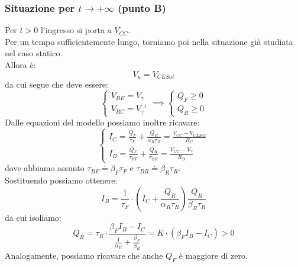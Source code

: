 \documentclass[../main.tex]{subfiles}
\begin{document}
	\subsubsection{Situazione per $t \rightarrow +\infty$ (punto B)}
	Per $t > 0$ l'ingresso si porta a $V_{CC}$.\\
	Per un tempo sufficientemente lungo, torniamo poi nella situazione già studiata nel caso statico.\\
	Allora è:
	\[ V_u = V_{CESat} \]
	da cui segue che deve essere:
	\[ \begin{cases} V_{BE} = V_\gamma \\ V_{BC} = V_\gamma' \end{cases} \implies \begin{cases} Q_F \geq 0 \\ Q_R \geq 0 \end{cases} \]
	Dalle equazioni del modello possiamo inoltre ricavare:
	\[ \begin{cases} I_C = \frac{Q_F}{\tau_F} + \frac{Q_R}{\alpha_R \tau_R} = \frac{V_{CC} - V_{CESat}}{R_C} \\ I_B = \frac{Q_F}{\tau_{BF}} + \frac{Q_R}{\tau_{BR}} = \frac{V_{CC} - V_\gamma}{R_B} \end{cases} \]
	dove abbiamo assunto $\tau_{BF} \doteq \beta_F \tau_F$ e $\tau_{BR} \doteq \beta_R \tau_R$.\\
	Sostituendo possiamo ottenere:
	\[ I_B = \frac{1}{\tau_F} \cdot \left( I_C + \frac{Q_R}{\alpha_R \tau_R} \right)  \frac{Q_R}{\beta_R \tau_R} \] 
	da cui isoliamo: 
	\[ Q_R = \tau_R \cdot \frac{\beta_F I_B - I_C}{\frac{1}{\alpha_R} + \frac{\beta_F}{\beta_R}} = K \cdot (\beta_F I_B - I_C) > 0 \]
	Analogamente, possiamo ricavare che anche $Q_F$ è maggiore di zero.
\end{document}
